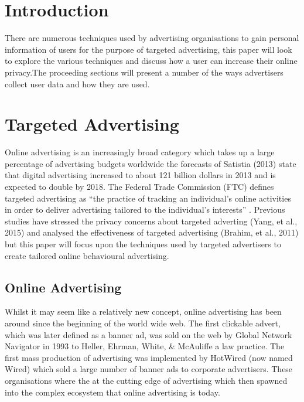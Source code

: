 \documentclass{article}
\begin{document}
\section{Introduction}
There are numerous techniques used by advertising organisations to gain personal information of users for the purpose of targeted advertising, this paper will look to explore the various techniques and discuss how a user can increase their online privacy.The proceeding sections will present a number of the ways advertisers collect user data and how they are used.  

\section{Targeted Advertising}
Online advertising is an increasingly broad category which takes up a large percentage of advertising budgets worldwide the forecasts of Satistia (2013) state that digital advertising increased to about 121 billion dollars in 2013 and is expected to double by 2018. The Federal Trade Commission (FTC) defines targeted advertising as ``the practice of tracking an individual’s online activities in order to deliver advertising tailored to the individual’s interests'' \parencite{comission2009}. Previous studies have stressed the privacy concerns about targeted adverting (Yang, et al., 2015) and analysed the effectiveness of targeted advertising (Brahim, et al., 2011) but this paper will focus upon the techniques used by targeted advertisers to create tailored online behavioural advertising. \newline

\subsection{Online Advertising}
Whilst it may seem like a relatively new concept, online advertising has been around since the beginning of the world wide web. The first clickable advert, which was later defined as a banner ad, was sold on the web by Global Network Navigator in 1993 to Heller, Ehrman, White, \& McAuliffe a law practice. The first mass production of advertising was implemented by HotWired (now named Wired) which sold a large number of banner ads to corporate advertisers. These organisations where the at the cutting edge of advertising which then spawned into the complex ecosystem that online advertising is today. \newline
\end{document}
